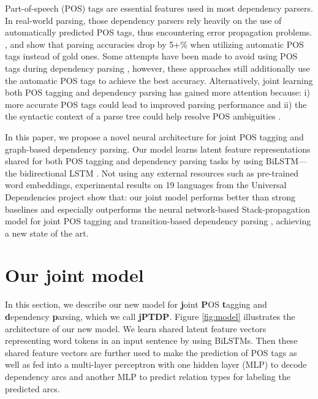 \documentclass[11pt,letterpaper]{article}
\begin{document}
Part-of-speech (POS) tags are essential features used 
in most dependency parsers. In real-world parsing, those dependency parsers rely heavily on the use of automatically predicted POS tags, thus  encountering  error propagation problems. \citet{Li:2011:JMC:2145432.2145557},  \citet{STRAKA16.873} and \citet{NguyenALTA2016}  show that parsing accuracies  drop  by 5+\%  when utilizing automatic POS tags instead of gold ones. Some attempts have been made to avoid using POS tags during dependency parsing \citep{dyer-EtAl:2015:ACL-IJCNLP,ballesterosEMNLP}, however, these approaches still additionally use the automatic POS tags to achieve the best accuracy. Alternatively, joint learning both POS tagging and dependency parsing has gained more attention because: i) more accurate POS tags could lead to improved parsing performance and ii) 
the the syntactic context of a parse tree could help resolve POS ambiguities \citep{Li:2011:JMC:2145432.2145557,hatori-EtAl:2011:IJCNLP-2011,Lee:2011:DMJ:2002472.2002584,bohnet-nivre:2012:EMNLP-CoNLL,qian-liu:2012:EMNLP-CoNLL,wang-xue:2014:P14-1,zhang-EtAl:2015:NAACL-HLT1,alberti-EtAl:2015:EMNLP,johannsenP16,zhang-weiss:2016:P16-1}.

 In this paper, we propose a novel neural architecture for  joint POS tagging and graph-based dependency parsing. Our model learns latent feature representations shared  for both POS tagging and dependency parsing tasks by using BiLSTM---the   bidirectional LSTM  \cite{Schuster1997BRN,HochreiterSchmidhuber1997b}. 
Not using any external resources such as pre-trained word embeddings,    experimental results on 19 languages from the Universal Dependencies project show that:  our joint model performs better than strong baselines and especially outperforms the 
neural network-based Stack-propagation model for joint POS tagging and transition-based dependency parsing \citep{zhang-weiss:2016:P16-1}, achieving a new state of the art. 

 
\section{Our joint model}

In this section, we  describe our new model for \textbf{j}oint \textbf{P}OS \textbf{t}agging and  \textbf{d}ependency \textbf{p}arsing, which we call  \textbf{jPTDP}. 
 Figure \ref{fig:model} illustrates the architecture of our new  model.   
We learn shared latent feature vectors representing  word tokens in an input sentence by using BiLSTMs. Then these shared feature vectors are further used to  make the  prediction of POS tags  as well as fed into a multi-layer perceptron with one hidden layer (MLP) to decode  dependency arcs and another MLP to predict  relation types for labeling the predicted arcs.
 
\end{document}
